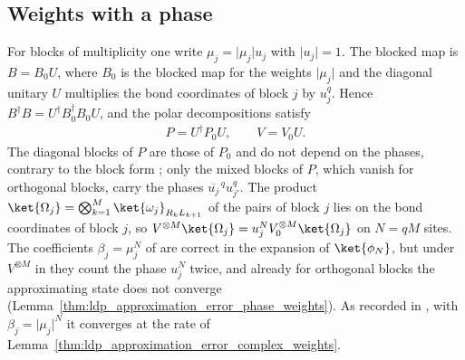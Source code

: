 
\subsection{Weights with a phase}\label{sec:ldp_complex_weights}

For blocks of multiplicity one write $\mu_j=\lvert\mu_j\rvert u_j$ with
$\lvert u_j\rvert=1$. The blocked map is $B=B_0U$, where $B_0$ is the blocked map
for the weights $\lvert\mu_j\rvert$ and the diagonal unitary $U$ multiplies the
bond coordinates of block $j$ by $u_j^q$. Hence
$B^\dagger B=U^\dagger B_0^\dagger B_0U$, and the polar decompositions satisfy
\begin{align*}
    P=U^\dagger P_0U,\qquad V=V_0U.
\end{align*}
The diagonal blocks of $P$ are those of $P_0$ and do not depend on the phases,
contrary to the block form \cite[eq.~(S5)]{Malz2024Preparation}; only the mixed
blocks of $P$, which vanish for orthogonal blocks, carry the phases
$\overline{u_j}^{\,q}u_{j'}^q$. The product
$\ket{\Omega_j}=\bigotimes_{k=1}^M\ket{\omega_j}_{R_kL_{k+1}}$ of the pairs of
block $j$ lies on the bond coordinates of block $j$, so
$V^{\otimes M}\ket{\Omega_j}=u_j^NV_0^{\otimes M}\ket{\Omega_j}$ on $N=qM$
sites. The coefficients $\beta_j=\mu_j^N$ of
\cite[eq.~(S4)]{Malz2024Preparation} are correct in the expansion
\cite[eq.~(S3)]{Malz2024Preparation} of $\ket{\phi_N}$, but under
$V^{\otimes M}$ in \cite[eqs.~(S6) and (S7)]{Malz2024Preparation} they count the
phase $u_j^N$ twice, and already for orthogonal blocks the approximating state
does not converge (Lemma~\ref{thm:ldp_approximation_error_phase_weights}). As
recorded in \cite{gap:mswc24_block_form_mixed_overlap}, with
$\beta_j=\lvert\mu_j\rvert^N$ it converges at the rate of
Lemma~\ref{thm:ldp_approximation_error_complex_weights}.

